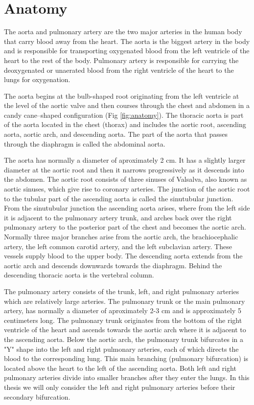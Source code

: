 \section{Anatomy} \label{sec:Anatomy}
The aorta and pulmonary artery are the two major arteries in the human body that carry blood away from the heart. The aorta is the biggest artery in the body and is responsible for transporting oxygenated blood from the left ventricle of the heart to the rest of the body. Pulmonary artery is responsible for carrying the deoxygenated or unaerated blood from the right ventricle of the heart to the lungs for oxygenation.

The aorta begins at the bulb-shaped root originating from the left ventricle at the level of the aortic valve and then courses through the chest and abdomen in a candy cane–shaped configuration (Fig \ref{fig:anatomy}). The thoracic aorta is part of the aorta located in the chest (thorax) and includes the aortic root, ascending aorta, aortic arch, and descending aorta. The part of the aorta that passes through the diaphragm is called the abdominal aorta.

The aorta has normally a diameter of aproximately 2 cm. It has a slightly larger diameter at the aortic root and then it narrows progressively as it descends into the abdomen. The aortic root consists of three sinuses of Valsalva, also known as aortic sinuses, which give rise to coronary arteries. The junction of the aortic root to the tubular part of the ascending aorta is called the sinutubular junction. From the sinutubular junction the ascending aorta arises, where from the left side it is adjacent to the pulmonary artery trunk, and arches back over the right pulmonary artery to the posterior part of the chest and becomes the aortic arch. Normally three major branches arise from the aortic arch, the brachiocephalic artery, the left common carotid artery, and the left subclavian artery. These vessels supply blood to the upper body. The descending aorta extends from the aortic arch and descends downwards towards the diaphragm. Behind the descending thoracic aorta is the vertebral column.


The pulmonary artery consists of the trunk, left, and right pulmonary arteries which are relatively large arteries. The pulmonary trunk or the main pulmonary artery, has normally a diameter of aproximately 2-3 cm and is approximately 5 centimeters long. The pulmonary trunk originates from the bottom of the right ventricle of the heart and ascends towards the aortic arch where it is adjacent to the ascending aorta. Below the aortic arch, the pulmonary trunk bifurcates in a "Y" shape into the left and right pulmonary arteries, each of which directs the blood to the corresponding lung. This main branching (pulmonary bifurcation) is located above the heart to the left of the ascending aorta. Both left and right pulmonary arteries divide into smaller branches after they enter the lungs. In this thesis we will only consider the left and right pulmonary arteries before their secondary bifurcation.


